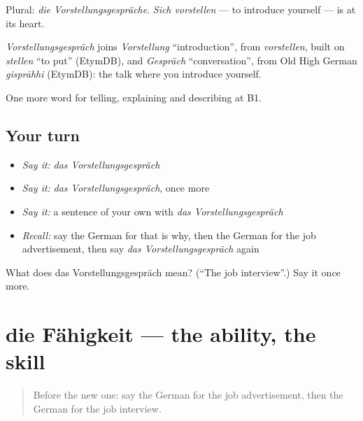 Plural: \emph{die Vorstellungsgespräche}. \emph{Sich vorstellen} — to introduce yourself — is at its heart.

\begin{cousinweb}
\emph{Vorstellungsgespräch} joins \emph{Vorstellung} \textquotedblleft{}introduction\textquotedblright{}, from \emph{vorstellen}, built on \emph{stellen} \textquotedblleft{}to put\textquotedblright{} (EtymDB), and \emph{Gespräch} \textquotedblleft{}conversation\textquotedblright{}, from Old High German \emph{gisprāhhi} (EtymDB): the talk where you introduce yourself.
\end{cousinweb}

\begin{grammarlens}[title={What you've built}]
One more word for telling, explaining and describing at B1.
\end{grammarlens}

\subsection*{Your turn}
\begin{itemize}
\raggedright
  \item \emph{Say it:} \emph{das Vorstellungsgespräch}
  \item \emph{Say it:} \emph{das Vorstellungsgespräch}, once more
  \item \emph{Say it:} a sentence of your own with \emph{das Vorstellungsgespräch}
  \item \emph{Recall:} say the German for that is why, then the German for the job advertisement, then say \emph{das Vorstellungsgespräch} again
\end{itemize}

\begin{tcolorbox}[breakable,colback=teal!4,colframe=teal!35!black,title={Before you move on}]
What does das Vorstellungsgespräch mean? (\textquotedblleft{}The job interview\textquotedblright{}.) Say it once more.
\end{tcolorbox}
\section[die Fähigkeit]{die Fähigkeit — the ability, the skill}

\label{lesson:GE-C349-faehigkeit}



\begin{quote}
Before the new one: say the German for the job advertisement, then the German for the job interview.
\end{quote}

